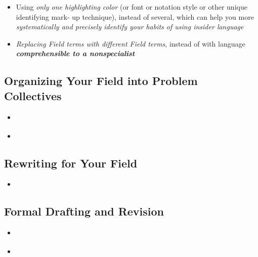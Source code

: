 \documentclass[11pt]{article}
\begin{document}
\begin{itemize}
\begin{itemize}
\item Using \emph{only one highlighting color} (or font or notation style or other unique identifying mark- up technique), instead of several, which can help you more \emph{systematically and precisely identify your habits of using insider language}

\item \emph{Replacing Field terms with different Field terms}, instead of with language \emph{\textbf{comprehensible to a nonspecialist}}
\end{itemize}

\end{itemize}
\subsection{Organizing Your Field into Problem Collectives}
\begin{itemize}
\item \begin{exercise}
\end{exercise}

\vspace{20pt}
\item  \begin{exercise}
\end{exercise} 
\end{itemize}
\subsection{Rewriting for Your Field}
\begin{itemize}
\item \begin{exercise}
\end{exercise} 
\end{itemize}
\subsection{Formal Drafting and Revision}
\begin{itemize}
\item \begin{exercise}
\end{exercise}

\vspace{20pt}
\item \begin{exercise}
\end{exercise}
\end{itemize}
\end{document}
